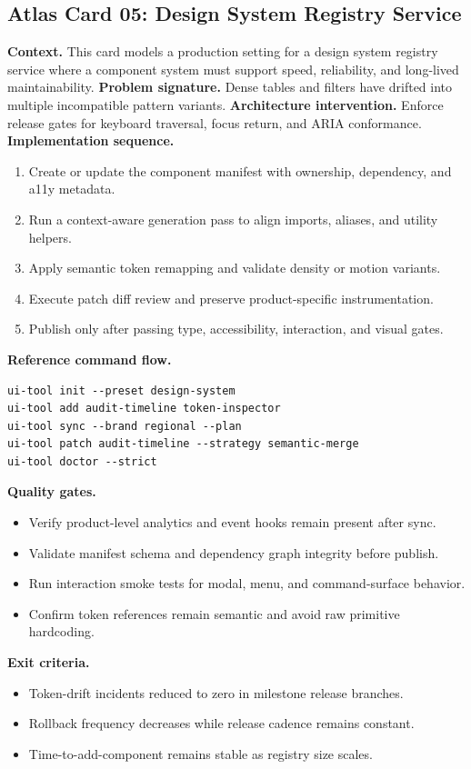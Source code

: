 \subsection*{Atlas Card 05: Design System Registry Service}
\textbf{Context.} This card models a production setting for a design system registry service where a component system must support speed, reliability, and long-lived maintainability.
\textbf{Problem signature.} Dense tables and filters have drifted into multiple incompatible pattern variants.
\textbf{Architecture intervention.} Enforce release gates for keyboard traversal, focus return, and ARIA conformance.
\textbf{Implementation sequence.}
\begin{enumerate}[leftmargin=*, itemsep=0.28em]
  \item Create or update the component manifest with ownership, dependency, and a11y metadata.
  \item Run a context-aware generation pass to align imports, aliases, and utility helpers.
  \item Apply semantic token remapping and validate density or motion variants.
  \item Execute patch diff review and preserve product-specific instrumentation.
  \item Publish only after passing type, accessibility, interaction, and visual gates.
\end{enumerate}
\textbf{Reference command flow.}
\begin{verbatim}
ui-tool init --preset design-system
ui-tool add audit-timeline token-inspector
ui-tool sync --brand regional --plan
ui-tool patch audit-timeline --strategy semantic-merge
ui-tool doctor --strict
\end{verbatim}
\textbf{Quality gates.}
\begin{itemize}[leftmargin=*, itemsep=0.24em]
  \item Verify product-level analytics and event hooks remain present after sync.
  \item Validate manifest schema and dependency graph integrity before publish.
  \item Run interaction smoke tests for modal, menu, and command-surface behavior.
  \item Confirm token references remain semantic and avoid raw primitive hardcoding.
\end{itemize}
\textbf{Exit criteria.}
\begin{itemize}[leftmargin=*, itemsep=0.24em]
  \item Token-drift incidents reduced to zero in milestone release branches.
  \item Rollback frequency decreases while release cadence remains constant.
  \item Time-to-add-component remains stable as registry size scales.
\end{itemize}
\clearpage
